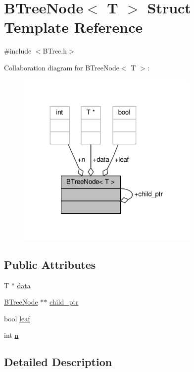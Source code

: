 \hypertarget{structBTreeNode}{}\section{B\+Tree\+Node$<$ T $>$ Struct Template Reference}
\label{structBTreeNode}


{\ttfamily \#include $<$B\+Tree.\+h$>$}



Collaboration diagram for B\+Tree\+Node$<$ T $>$\+:\nopagebreak
\begin{figure}[H]
\begin{center}
\leavevmode
\includegraphics[width=251pt]{structBTreeNode__coll__graph}
\end{center}
\end{figure}
\subsection*{Public Attributes}
\begin{DoxyCompactItemize}
\item 
T $\ast$ \hyperlink{structBTreeNode_af877c66e47b110ed0f05e95351003531}{data}
\item 
\hyperlink{structBTreeNode}{B\+Tree\+Node} $\ast$$\ast$ \hyperlink{structBTreeNode_a723857b74be44c1921f17e177432a844}{child\+\_\+ptr}
\item 
bool \hyperlink{structBTreeNode_a8350f9ddcf6e2323413d9d061c382ea6}{leaf}
\item 
int \hyperlink{structBTreeNode_ac6993709a99bec1116e1c6dccc3c0f8a}{n}
\end{DoxyCompactItemize}


\subsection{Detailed Description}
